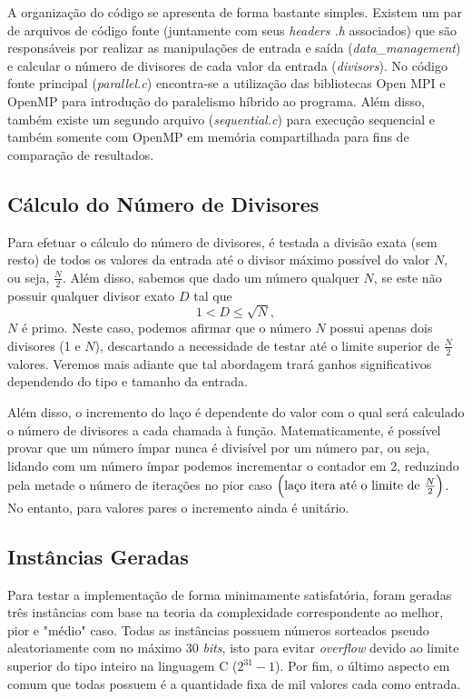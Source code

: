 \documentclass[a4paper, 12pt]{article}
\begin{document}
A organização do código se apresenta de forma bastante simples. Existem um par de arquivos de código fonte (juntamente com seus \emph{headers .h} associados) que são responsáveis por realizar as manipulações de entrada e saída (\emph{data\_management}) e calcular o número de divisores de cada valor da entrada (\emph{divisors}). No código fonte principal (\emph{parallel.c}) encontra-se a utilização das bibliotecas Open MPI e OpenMP para introdução do paralelismo híbrido ao programa. Além disso, também existe um segundo arquivo (\emph{sequential.c}) para execução sequencial e também somente com OpenMP em memória compartilhada para fins de comparação de resultados.

\subsection{Cálculo do Número de Divisores}

Para efetuar o cálculo do número de divisores, é testada a divisão exata (sem resto) de todos os valores da entrada até o divisor máximo possível do valor \(N\), ou seja, \(\frac{N}{2}\). Além disso, sabemos que dado um número qualquer \(N\), se este não possuir qualquer divisor exato \(D\) tal que 
\begin{equation} \label{eq1}
1 < D \leq \sqrt{N},
\end{equation}
\(N\) é primo. Neste caso, podemos afirmar que o número \(N\) possui apenas dois divisores (1 e \(N\)), descartando a necessidade de testar até o limite superior de \(\frac{N}{2}\) valores. Veremos mais adiante que tal abordagem trará ganhos significativos dependendo do tipo e tamanho da entrada.

Além disso, o incremento do laço é dependente do valor com o qual será calculado o número de divisores a cada chamada à função. Matematicamente, é possível provar que um número ímpar nunca é divisível por um número par, ou seja, lidando com um número ímpar podemos incrementar o contador em 2, reduzindo pela metade o número de iterações no pior caso $\Bigl(\text{laço itera até o limite de } \frac{N}{2}\Bigl)$. No entanto, para valores pares o incremento ainda é unitário.

\subsection{Instâncias Geradas} \label{sub2}

Para testar a implementação de forma minimamente satisfatória, foram geradas três instâncias com base na teoria da complexidade correspondente ao melhor, pior e "médio" \hspace{0.1cm}caso. Todas as instâncias possuem números sorteados pseudo aleatoriamente com no máximo 30 \emph{bits}, isto para evitar \emph{overflow} devido ao limite superior do tipo inteiro na linguagem C (\(2^{31} - 1\)). Por fim, o último aspecto em comum que todas possuem é a quantidade fixa de mil valores cada como entrada.
\end{document}
